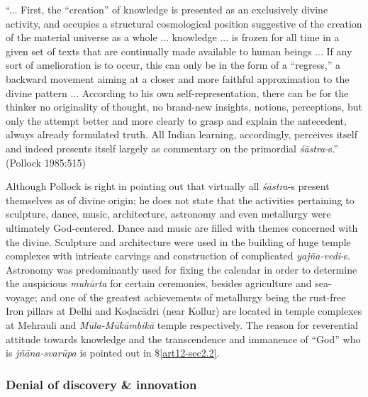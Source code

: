 \newpage

\begin{myquote}
``... First, the ``creation'' of knowledge is presented as an exclusively divine activity, and occupies a structural cosmological position suggestive of the creation of the material universe as a whole ... knowledge ... is frozen for all time in a given set of texts that are continually made available to human beings ... If any sort of amelioration is to occur, this  can only be in the form of a ``regress,'' a backward movement aiming at a closer and more  faithful approximation to the divine pattern ...  According to his own self-representation, there can be for the thinker no originality of thought, no brand-new insights, notions, perceptions, but only the attempt better and more clearly to grasp and explain the antecedent, always already formulated truth. All Indian learning, accordingly, perceives itself and indeed presents itself largely as commentary on the primordial {\sl śāstra}-s.'' (Pollock 1985:515)
\end{myquote}

Although Pollock is right in pointing out that virtually all {\sl śāstra}-s present themselves as of divine origin; he does not state that the activities pertaining to sculpture, dance, music, architecture, astronomy and even metallurgy were ultimately God-centered. Dance and music are ﬁlled with themes concerned with the divine. Sculpture and architecture were used in the building of huge temple complexes with intricate carvings and construction of complicated {\sl yajña-vedi}-s. Astronomy was predominantly used for ﬁxing the calendar in order to determine the auspicious {\sl muhūrta} for certain ceremonies, besides agriculture and sea-voyage; and one of the greatest achievements of metallurgy being the rust-free Iron pillars at Delhi and Koḍacādri (near Kollur) are located in temple complexes at Mehrauli and {\sl Mūla-Mūkāmbikā} temple respectively. The reason for reverential attitude towards knowledge and the transcendence and immanence of ``God'' who is {\sl jñāna-svarūpa} is pointed out in \$\ref{art12-sec2.2}.

\subsubsection{Denial of discovery \& innovation}\label{art12-sec3.8.2}

